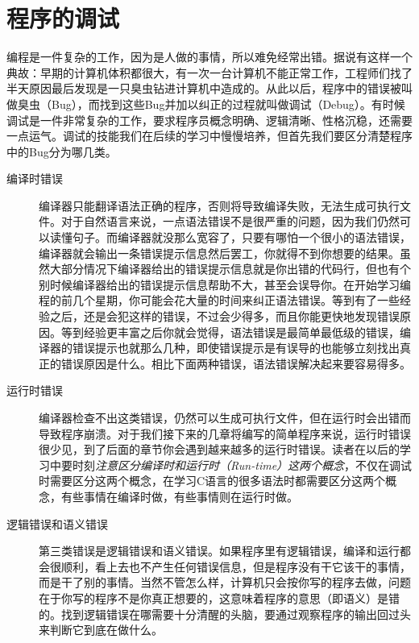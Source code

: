 


\section{程序的调试}
%
编程是一件复杂的工作，因为是人做的事情，所以难免经常出错。据说有这样一个典故：早期的计算机体积都很大，有一次一台计算机不能正常工作，工程师们找了半天原因最后发现是一只臭虫钻进计算机中造成的。从此以后，程序中的错误被叫做臭虫（Bug），而找到这些Bug并加以纠正的过程就叫做调试（Debug）。有时候调试是一件非常复杂的工作，要求程序员概念明确、逻辑清晰、性格沉稳，还需要一点运气。调试的技能我们在后续的学习中慢慢培养，但首先我们要区分清楚程序中的Bug分为哪几类。


\begin{description}
\item[{编译时错误}]


编译器只能翻译语法正确的程序，否则将导致编译失败，无法生成可执行文件。对于自然语言来说，一点语法错误不是很严重的问题，因为我们仍然可以读懂句子。而编译器就没那么宽容了，只要有哪怕一个很小的语法错误，编译器就会输出一条错误提示信息然后罢工，你就得不到你想要的结果。虽然大部分情况下编译器给出的错误提示信息就是你出错的代码行，但也有个别时候编译器给出的错误提示信息帮助不大，甚至会误导你。在开始学习编程的前几个星期，你可能会花大量的时间来纠正语法错误。等到有了一些经验之后，还是会犯这样的错误，不过会少得多，而且你能更快地发现错误原因。等到经验更丰富之后你就会觉得，语法错误是最简单最低级的错误，编译器的错误提示也就那么几种，即使错误提示是有误导的也能够立刻找出真正的错误原因是什么。相比下面两种错误，语法错误解决起来要容易得多。

\item[{运行时错误}]


编译器检查不出这类错误，仍然可以生成可执行文件，但在运行时会出错而导致程序崩溃。对于我们接下来的几章将编写的简单程序来说，运行时错误很少见，到了后面的章节你会遇到越来越多的运行时错误。读者在以后的学习中要时刻\emph{注意区分编译时和运行时（Run-time）这两个概念}，不仅在调试时需要区分这两个概念，在学习C语言的很多语法时都需要区分这两个概念，有些事情在编译时做，有些事情则在运行时做。

\item[{逻辑错误和语义错误}]


第三类错误是逻辑错误和语义错误。如果程序里有逻辑错误，编译和运行都会很顺利，看上去也不产生任何错误信息，但是程序没有干它该干的事情，而是干了别的事情。当然不管怎么样，计算机只会按你写的程序去做，问题在于你写的程序不是你真正想要的，这意味着程序的意思（即语义）是错的。找到逻辑错误在哪需要十分清醒的头脑，要通过观察程序的输出回过头来判断它到底在做什么。


\end{description}


